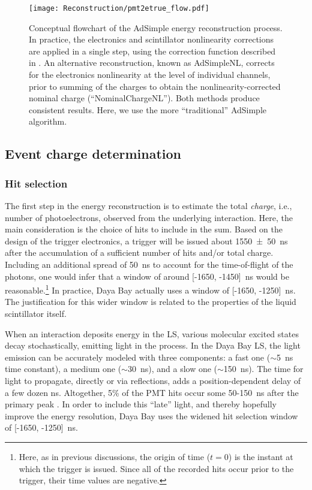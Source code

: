 \documentclass[../thesis.tex]{subfiles}
\begin{document}
\begin{figure}[h]
  \texttt{[image: Reconstruction/pmt2etrue\_flow.pdf]}
  \caption{Conceptual flowchart of the AdSimple energy reconstruction process. In practice, the electronics and scintillator nonlinearity corrections are applied in a single step, using the correction function described in \cite{NonlinearityPaper}. An alternative reconstruction, known as AdSimpleNL, corrects for the electronics nonlinearity at the level of individual channels, prior to summing of the charges to obtain the nonlinearity-corrected nominal charge (``NominalChargeNL''). Both methods produce consistent results. Here, we use the more ``traditional'' AdSimple algorithm.}
  \label{fig:pmt2etrue}
\end{figure}

\subsection{Event charge determination}
\label{sec:reconEnergyCharge}

\subsubsection{Hit selection}
\label{sec:reconHitSelection}

The first step in the energy reconstruction is to estimate the total \emph{charge}, i.e., number of photoelectrons, observed from the underlying interaction. Here, the main consideration is the choice of hits to include in the sum. Based on the design of the trigger electronics, a trigger will be issued about \SI{1550 \pm 50}{ns} after the accumulation of a sufficient number of hits and/or total charge. Including an additional spread of 50~ns to account for the time-of-flight of the photons, one would infer that a window of around [-1650, -1450]~ns would be reasonable.\footnote{Here, as in previous discussions, the origin of time ($t = 0$) is the instant at which the trigger is issued. Since all of the recorded hits occur prior to the trigger, their time values are negative.} In practice, Daya Bay actually uses a window of [-1650, -1250]~ns. The justification for this wider window is related to the properties of the liquid scintillator itself.

When an interaction deposits energy in the LS, various molecular excited states decay stochastically, emitting light in the process. In the Daya Bay LS, the light emission can be accurately modeled with three components: a fast one ($\sim$5~ns time constant), a medium one ($\sim$30~ns), and a slow one ($\sim$150~ns). The time for light to propagate, directly or via reflections, adds a position-dependent delay of a few dozen ns. Altogether, 5\% of the PMT hits occur some 50-150~ns after the primary peak \cite{peakCharge}. In order to include this ``late'' light, and thereby hopefully improve the energy resolution, Daya Bay uses the widened hit selection window of [-1650, -1250]~ns.
\end{document}
